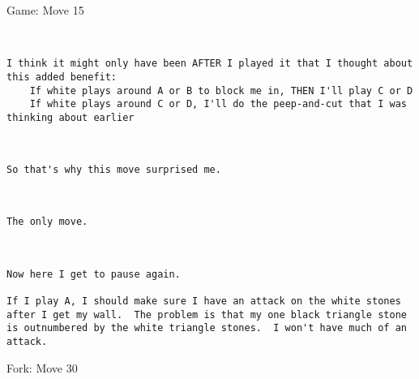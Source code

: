 \documentclass{article}
\begin{document}
\newpage
\begin{section}{Game: Move 15}
\begin{center}
\cleargoban
{}
\showfullgoban
\\\begin{lstlisting}
I think it might only have been AFTER I played it that I thought about this added benefit:
	If white plays around A or B to block me in, THEN I'll play C or D
	If white plays around C or D, I'll do the peep-and-cut that I was thinking about earlier\end{lstlisting}
\end{center}
\begin{center}
\cleargoban
{}
\showfullgoban
\\\begin{lstlisting}
So that's why this move surprised me.\end{lstlisting}
\end{center}
\begin{center}
\cleargoban
{}
\showfullgoban
\\\begin{lstlisting}
The only move.\end{lstlisting}
\end{center}
\begin{center}
\cleargoban
{}
\showfullgoban
\\\begin{lstlisting}
Now here I get to pause again.

If I play A, I should make sure I have an attack on the white stones after I get my wall.  The problem is that my one black triangle stone is outnumbered by the white triangle stones.  I won't have much of an attack.\end{lstlisting}
\end{center}
\end{section}
\begin{subsection}{Fork: Move 30}
\end{subsection}
\newpage
\end{document}

